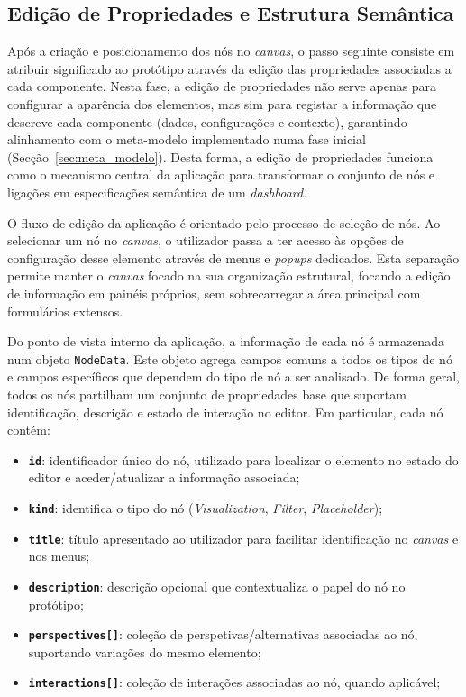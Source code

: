 \subsection{Edição de Propriedades e Estrutura Semântica}
\label{subsec:cap4_editor_propriedades}

Após a criação e posicionamento dos nós no \textit{canvas}, o passo seguinte consiste em atribuir significado ao protótipo através da edição das propriedades associadas a cada componente. Nesta fase, a edição de propriedades não serve apenas para configurar a aparência dos elementos, mas sim para registar a informação que descreve cada componente (dados, configurações e contexto), garantindo alinhamento com o meta-modelo implementado numa fase inicial (Secção~\ref{sec:meta_modelo}). Desta forma, a edição de propriedades funciona como o mecanismo central da aplicação para transformar o conjunto de nós e ligações em especificações semântica de um \textit{dashboard}.

O fluxo de edição da aplicação é orientado pelo processo de seleção de nós. Ao selecionar um nó no \textit{canvas}, o utilizador passa a ter acesso às opções de configuração desse elemento através de menus e \textit{popups} dedicados. Esta separação permite manter o \textit{canvas} focado na sua organização estrutural, focando a edição de informação em painéis próprios, sem sobrecarregar a área principal com formulários extensos.

Do ponto de vista interno da aplicação, a informação de cada nó é armazenada num objeto \texttt{NodeData}. Este objeto agrega campos comuns a todos os tipos de nó e campos específicos que dependem do tipo de nó a ser analisado. De forma geral, todos os nós partilham um conjunto de propriedades base que suportam identificação, descrição e estado de interação no editor. Em particular, cada nó contém:

\begin{itemize}
    \item \textbf{\texttt{id}}: identificador único do nó, utilizado para localizar o elemento no estado do editor e aceder/atualizar a informação associada;
    \item \textbf{\texttt{kind}}: identifica o tipo do nó (\textit{Visualization}, \textit{Filter}, \textit{Placeholder});
    \item \textbf{\texttt{title}}: título apresentado ao utilizador para facilitar identificação no \textit{canvas} e nos menus;
    \item \textbf{\texttt{description}}: descrição opcional que contextualiza o papel do nó no protótipo;
    \item \textbf{\texttt{perspectives[]}}: coleção de perspetivas/alternativas associadas ao nó, suportando variações do mesmo elemento;
    \item \textbf{\texttt{interactions[]}}: coleção de interações associadas ao nó, quando aplicável;
\end{itemize}


